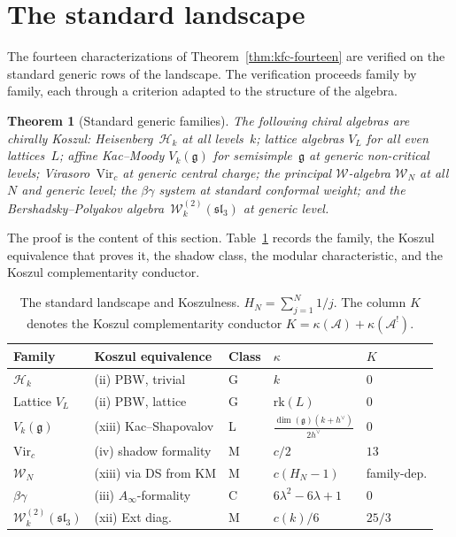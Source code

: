 \documentclass[11pt,reqno]{amsart}
\newtheorem{theorem}{Theorem}[section]
\theoremstyle{definition}
\theoremstyle{remark}
\newcommand{\cA}{\mathcal{A}}
\newcommand{\cW}{\mathcal{W}}
\newcommand{\fg}{\mathfrak{g}}
\newcommand{\Vir}{\mathrm{Vir}}
\newcommand{\Ainfty}{A_\infty}
\numberwithin{equation}{section}
\begin{document}
\section{The standard landscape}
\label{sec:landscape}

The fourteen characterizations of
Theorem~\ref{thm:kfc-fourteen} are verified on the standard
generic rows of the landscape. The verification proceeds family
by family, each through a criterion adapted to the structure of
the algebra.

\begin{theorem}[Standard generic families]
\label{thm:kfc-landscape}
The following chiral algebras are chirally Koszul:
Heisenberg~$\mathcal{H}_k$ at all levels~$k$; lattice
algebras $V_L$ for all even lattices~$L$; affine Kac--Moody
$V_k(\fg)$ for semisimple~$\fg$ at generic non-critical
levels; Virasoro~$\Vir_c$ at generic central charge; the
principal $\cW$-algebra $\cW_N$ at all $N$ and generic level; the
$\beta\gamma$ system at standard conformal weight; and the
Bershadsky--Polyakov algebra~$\cW^{(2)}_k(\mathfrak{sl}_3)$ at
generic level.
\end{theorem}

The proof is the content of this section. Table~\ref{tab:landscape}
records the family, the Koszul equivalence that proves it, the
shadow class, the modular characteristic, and the Koszul
complementarity conductor.

\begin{table}[ht]
\centering
\renewcommand{\arraystretch}{1.3}
\begin{tabular}{lllll}
\toprule
Family & Koszul equivalence & Class & $\kappa$ & $K$ \\
\midrule
$\mathcal{H}_k$ & (ii) PBW, trivial & G & $k$ & $0$ \\
Lattice $V_L$ & (ii) PBW, lattice & G & $\mathrm{rk}(L)$ & $0$ \\
$V_k(\fg)$ & (xiii) Kac--Shapovalov & L & $\frac{\dim(\fg)(k+h^\vee)}{2h^\vee}$ & $0$ \\
$\Vir_c$ & (iv) shadow formality & M & $c/2$ & $13$ \\
$\cW_N$ & (xiii) via DS from KM & M & $c(H_N-1)$ & family-dep. \\
$\beta\gamma$ & (iii) $\Ainfty$-formality & C & $6\lambda^2-6\lambda+1$ & $0$ \\
$\cW^{(2)}_k(\mathfrak{sl}_3)$ & (xii) Ext diag. & M & $c(k)/6$ & $25/3$ \\
\bottomrule
\end{tabular}
\caption{The standard landscape and Koszulness.
  $H_N = \sum_{j=1}^{N} 1/j$. The column $K$ denotes the Koszul
  complementarity conductor $K = \kappa(\cA) + \kappa(\cA^!)$.}
\label{tab:landscape}
\end{table}
\end{document}
